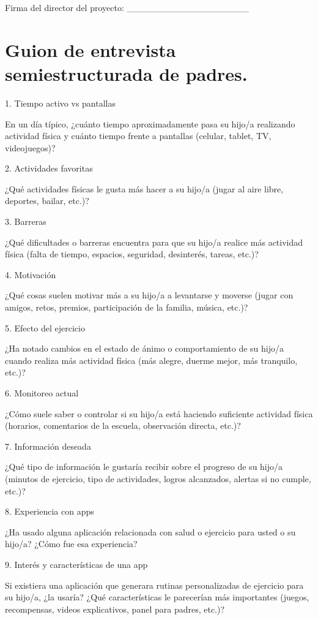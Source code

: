 		Firma del director del proyecto: \_\_\_\_\_\_\_\_\_\_\_\_\_\_\_\_\_\_\_
	\section{Guion de entrevista semiestructurada de padres.}
		1. Tiempo activo vs pantallas
		
		En un día típico, ¿cuánto tiempo aproximadamente pasa su hijo/a realizando actividad física y cuánto tiempo frente a pantallas (celular, tablet, TV, videojuegos)?
		
		2. Actividades favoritas
		
		¿Qué actividades físicas le gusta más hacer a su hijo/a (jugar al aire libre, deportes, bailar, etc.)?
		
		3. Barreras
		
		¿Qué dificultades o barreras encuentra para que su hijo/a realice más actividad física (falta de tiempo, espacios, seguridad, desinterés, tareas, etc.)?
		
		4. Motivación
		
		¿Qué cosas suelen motivar más a su hijo/a a levantarse y moverse (jugar con amigos, retos, premios, participación de la familia, música, etc.)?
		
		5. Efecto del ejercicio
		
		¿Ha notado cambios en el estado de ánimo o comportamiento de su hijo/a cuando realiza más actividad física (más alegre, duerme mejor, más tranquilo, etc.)?
		
		6. Monitoreo actual
		
		¿Cómo suele saber o controlar si su hijo/a está haciendo suficiente actividad física (horarios, comentarios de la escuela, observación directa, etc.)?
		
		7. Información deseada
		
		¿Qué tipo de información le gustaría recibir sobre el progreso de su hijo/a (minutos de ejercicio, tipo de actividades, logros alcanzados, alertas si no cumple, etc.)?
		
		8. Experiencia con apps
		
		¿Ha usado alguna aplicación relacionada con salud o ejercicio para usted o su hijo/a? ¿Cómo fue esa experiencia?
		
		9. Interés y características de una app
		
		Si existiera una aplicación que generara rutinas personalizadas de ejercicio para su hijo/a, ¿la usaría? ¿Qué características le parecerían más importantes (juegos, recompensas, videos explicativos, panel para padres, etc.)?
		
